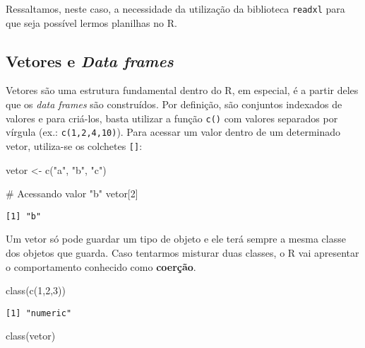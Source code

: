 \documentclass[
  12pt,
  letterpaper,
  DIV=11,
  numbers=noendperiod]{scrreprt}
\newenvironment{Shaded}{\begin{snugshade}}{\end{snugshade}}
\newcommand{\CommentTok}[1]{\textcolor[rgb]{0.37,0.37,0.37}{#1}}
\newcommand{\DecValTok}[1]{\textcolor[rgb]{0.68,0.00,0.00}{#1}}
\newcommand{\FunctionTok}[1]{\textcolor[rgb]{0.28,0.35,0.67}{#1}}
\newcommand{\NormalTok}[1]{\textcolor[rgb]{0.00,0.23,0.31}{#1}}
\newcommand{\OtherTok}[1]{\textcolor[rgb]{0.00,0.23,0.31}{#1}}
\newcommand{\StringTok}[1]{\textcolor[rgb]{0.13,0.47,0.30}{#1}}
\begin{document}
\noindent Ressaltamos, neste caso, a necessidade da utilização da
biblioteca \texttt{readxl} para que seja possível lermos planilhas no R.

\subsection{\texorpdfstring{Vetores e \emph{Data
frames}}{Vetores e Data frames}}\label{vetores-e-data-frames}

Vetores são uma estrutura fundamental dentro do R, em especial, é a
partir deles que os \emph{data frames} são construídos. Por definição,
são conjuntos indexados de valores e para criá-los, basta utilizar a
função \texttt{c()} com valores separados por vírgula (ex.:
\texttt{c(1,2,4,10)}). Para acessar um valor dentro de um determinado
vetor, utiliza-se os colchetes \texttt{{[}{]}}:

\begin{Shaded}
\begin{Highlighting}[]
\NormalTok{vetor }\OtherTok{\textless{}{-}} \FunctionTok{c}\NormalTok{(}\StringTok{"a"}\NormalTok{, }\StringTok{"b"}\NormalTok{, }\StringTok{"c"}\NormalTok{)}

\CommentTok{\# Acessando valor "b"}
\NormalTok{vetor[}\DecValTok{2}\NormalTok{]}
\end{Highlighting}
\end{Shaded}

\begin{verbatim}
[1] "b"
\end{verbatim}

\noindent Um vetor só pode guardar um tipo de objeto e ele terá sempre a
mesma classe dos objetos que guarda. Caso tentarmos misturar duas
classes, o R vai apresentar o comportamento conhecido como
\textbf{coerção}.

\begin{Shaded}
\begin{Highlighting}[]
\FunctionTok{class}\NormalTok{(}\FunctionTok{c}\NormalTok{(}\DecValTok{1}\NormalTok{,}\DecValTok{2}\NormalTok{,}\DecValTok{3}\NormalTok{))}
\end{Highlighting}
\end{Shaded}

\begin{verbatim}
[1] "numeric"
\end{verbatim}

\begin{Shaded}
\begin{Highlighting}[]
\FunctionTok{class}\NormalTok{(vetor)}
\end{Highlighting}
\end{Shaded}
\end{document}
